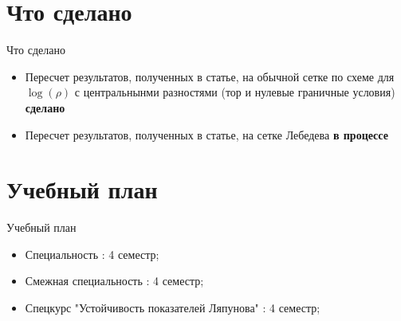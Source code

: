 \documentclass{beamer}
\theoremstyle{plain}
\begin{document}
	\section{Что сделано}
		\begin{frame}{Что сделано}
	
		\begin{itemize}
			\item Пересчет результатов, полученных в статье, на обычной сетке по схеме для $\log (\rho)$ с центральнынми разностями (тор и нулевые граничные условия) {\bfseries сделано}
		
			
			\item Пересчет результатов, полученных в статье, на сетке Лебедева {\bfseries в процессе}
		\end{itemize}
			
	\end{frame}
	
	\section{Учебный план}

	\begin{frame}{Учебный план}
	
		\begin{itemize}
			\item Специальность :  4 семестр;
			\item Смежная специальность :  4 семестр;
			\item Спецкурс "Устойчивость показателей Ляпунова" :  4 семестр;  
		\end{itemize}
			
	\end{frame}
\end{document}
